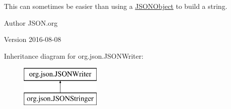 This can sometimes be easier than using a \hyperlink{classorg_1_1json_1_1JSONObject}{J\-S\-O\-N\-Object} to build a string. \begin{DoxyAuthor}{Author}
J\-S\-O\-N.\-org 
\end{DoxyAuthor}
\begin{DoxyVersion}{Version}
2016-\/08-\/08 
\end{DoxyVersion}
Inheritance diagram for org.\-json.\-J\-S\-O\-N\-Writer\-:\begin{figure}[H]
\begin{center}
\leavevmode
\includegraphics[height=2.000000cm]{classorg_1_1json_1_1JSONWriter}
\end{center}
\end{figure}
